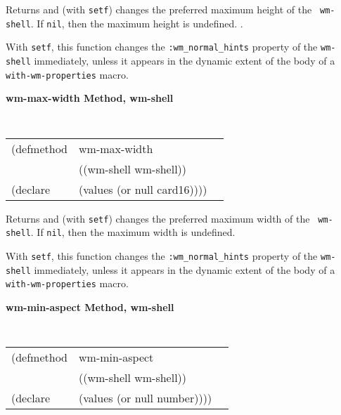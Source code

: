 \documentclass[twoside]{book}
\begin{document}
\begin{sloppy}
{\begin{flushright}
{}\end{flushright}}

\begin{flushright} \parbox[t]{6.125in}{
Returns and (with {\tt setf}) changes the preferred maximum height of the {\tt
wm-shell}. If {\tt nil}, then the maximum height is undefined. .

With {\tt setf}, this function changes the {\tt :wm\_normal\_hints} property of
the {\tt wm-shell} immediately, unless it appears in the dynamic extent of the
body of a {\tt with-wm-properties} macro.

}\end{flushright}

{\samepage
{\large {\bf wm-max-width \hfill Method, wm-shell}}
\begin{flushright} \parbox[t]{6.125in}{
\tt
\begin{tabular}{lll}
\raggedright
(defmethod & wm-max-width & \\
           & ((wm-shell  wm-shell)) \\
(declare   & (values (or null card16))))
\end{tabular}
\rm

}\end{flushright}}

\begin{flushright} \parbox[t]{6.125in}{
Returns and (with {\tt setf}) changes the preferred maximum width of the {\tt
wm-shell}. If {\tt nil}, then the maximum width is undefined. 

With {\tt setf}, this function changes the {\tt :wm\_normal\_hints} property of
the {\tt wm-shell} immediately, unless it appears in the dynamic extent of the
body of a {\tt with-wm-properties} macro.

}\end{flushright}




{\samepage
{\large {\bf wm-min-aspect \hfill Method, wm-shell}}
\begin{flushright} \parbox[t]{6.125in}{
\tt
\begin{tabular}{lll}
\raggedright
(defmethod & wm-min-aspect & \\
           & ((wm-shell  wm-shell)) \\
(declare   & (values (or null number))))
\end{tabular}
\rm

}
\end{flushright}}
\end{sloppy}
\end{document}
